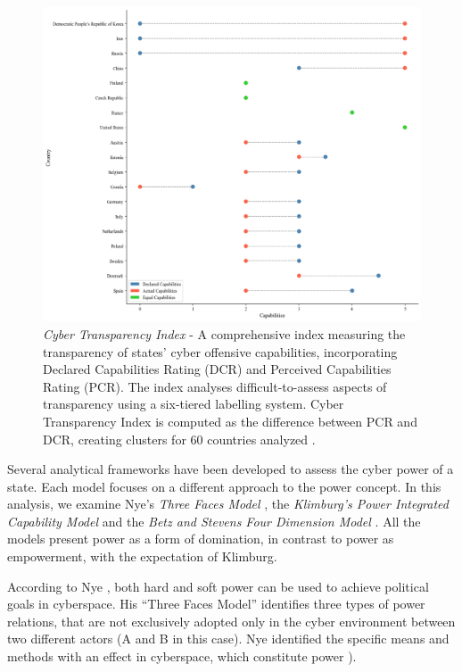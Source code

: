 \begin{figure}[H]
    \centering
    \includegraphics[width=1\textwidth]{Images/cybercap.png}
    \caption{\textit{Cyber Transparency Index} - A comprehensive index measuring the transparency of states' cyber offensive capabilities, incorporating Declared Capabilities Rating (DCR) and Perceived Capabilities Rating (PCR). The index analyses difficult-to-assess aspects of transparency using a six-tiered labelling system. Cyber Transparency Index is computed as the difference between PCR and DCR, creating clusters for 60 countries analyzed \autocite[4]{faesen_2022_cyber}.}
    \label{fig:cybercap}
\end{figure}

Several analytical frameworks have been developed to assess the cyber power of a state. Each model focuses on a different approach to the power concept. In this analysis, we examine Nye’s \textit{Three Faces Model } \autocite{nye_2010_cyber}, the\textit{ Klimburg’s Power Integrated Capability Model} \autocite{klimburg_2011_cybersecurity} and the \textit{Betz and Stevens Four Dimension Model} \autocite{betz_2011_cyberspace}. All the models present power as a form of domination, in contrast to power as empowerment, \parencite{haugaard_2012_rethinking, dunncavelty_2018_europes} with the expectation of Klimburg.

According to Nye  \textcite{nye_2010_cyber}, both hard and soft power can be used to achieve political goals in cyberspace. His “Three Faces Model” identifies three types of power relations, that are not exclusively adopted only in the cyber environment between two different actors (A and B in this case). Nye identified the specific means and methods with an effect in cyberspace, which constitute power \autocite{vanhaaster_2016_assessing}). 


